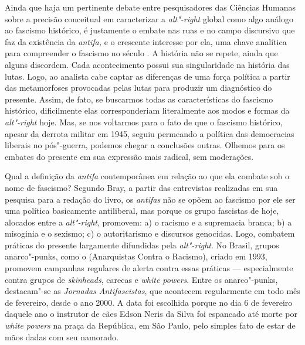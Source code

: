 Ainda que haja um pertinente debate entre pesquisadores das Ciências
Humanas sobre a precisão conceitual em caracterizar a \emph{alt"-right}
global como algo análogo ao fascismo histórico, é justamente o embate
nas ruas e no campo discursivo que faz da existência da \emph{antifa,} e
o crescente interesse por ela, uma chave analítica para compreender o
fascismo no século . A história não se repete, ainda que alguns
discordem. Cada acontecimento possui sua singularidade na história das
lutas. Logo, ao analista cabe captar as diferenças de uma força política
a partir das metamorfoses provocadas pelas lutas para produzir um
diagnóstico do presente. Assim, de fato, se buscarmos todas as
características do fascismo histórico, dificilmente elas corresponderiam
literalmente aos modos e formas da \emph{alt"-right} hoje. Mas, se nos
voltarmos para o fato de que o fascismo histórico, apesar da derrota
militar em 1945, seguiu permeando a política das democracias liberais no %
pós"-guerra, podemos chegar a conclusões outras. Olhemos para os embates
do presente em sua expressão mais radical, sem moderações.

Qual a definição da \emph{antifa} contemporânea em relação ao que ela
combate sob o nome de fascismo? Segundo Bray, a partir das entrevistas
realizadas em sua pesquisa para a redação do livro, os \emph{antifas}
não se opõem ao fascismo por ele ser uma política basicamente
antiliberal, mas porque os grupo fascistas de hoje, alocados entre a
\emph{alt"-right}, promovem: a) o racismo e a supremacia branca; b) a
misoginia e o sexismo; c) o autoritarismo e discursos genocidas. Logo,
combatem práticas do presente largamente difundidas pela
\emph{alt"-right}. No Brasil, grupos anarco"-punks, como o 
(Anarquistas Contra o Racismo), criado em 1993, promovem campanhas
regulares de alerta contra essas práticas --- especialmente contra grupos
de \emph{skinheads}, carecas e \emph{white powers}. Entre os
anarco"-punks, destacam"-se as \emph{Jornadas Antifascistas}, que
acontecem regularmente em todo mês de fevereiro, desde o ano 2000. A data
foi escolhida porque no dia 6 de fevereiro daquele ano o instrutor de
cães Edson Neris da Silva foi espancado até morte por \emph{white
powers} na praça da República, em São Paulo, pelo simples fato de estar
de mãos dadas com seu namorado.

